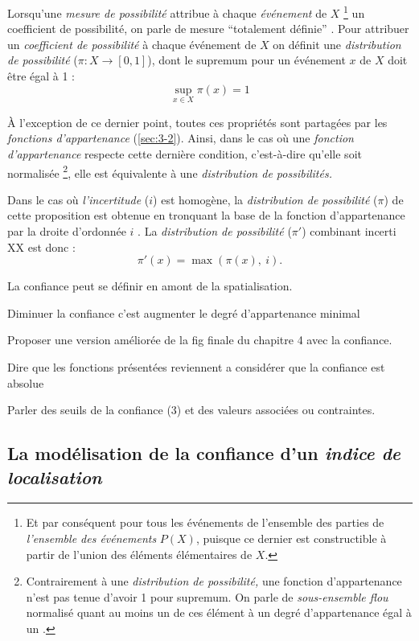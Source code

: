 Lorsqu'une \emph{mesure de possibilité} attribue à chaque
\emph{événement} de \(X\) \footnote{Et par conséquent pour tous les
  événements de l'ensemble des parties de \emph{l'ensemble des
    événements} \(P(X)\), puisque ce dernier est constructible à
  partir de l'union des éléments élémentaires de \(X\).} un
coefficient de possibilité, on parle de mesure \enquote{totalement
  définie} \autocite{Bouchon-Meunier2007}. Pour attribuer un
\emph{coefficient de possibilité} à chaque événement de \(X\) on
définit une \emph{distribution de possibilité} (\(π : X → [0,1]\)),
dont le supremum pour un événement \(x\) de \(X\) doit être égal à 1 :
%
\begin{equation}
  \sup_{x ∈ X}π(x)=1
\end{equation}

À l'exception de ce dernier point, toutes ces propriétés sont
partagées par les \emph{fonctions d'appartenance}
(\autoref{sec:3-2}). Ainsi, dans le cas où une \emph{fonction
  d'appartenance} respecte cette dernière condition, c'est-à-dire
qu'elle soit normalisée \footnote{Contrairement à une
  \emph{distribution de possibilité,} une fonction d'appartenance
  n'est pas tenue d'avoir 1 pour supremum. On parle de
  \emph{sous-ensemble flou} normalisé quant au moins un de ces élément
  à un degré d’appartenance égal à un
  \autocite{Bouchon-Meunier2007}.}, elle est équivalente à une
\emph{distribution de possibilités.}

Dans le cas où \emph{l'incertitude} (\(i\)) est homogène, la
\emph{distribution de possibilité} (\(π\)) de cette proposition est
obtenue en tronquant la base de la fonction d'appartenance par la
droite d'ordonnée \(i\) \autocite{Bouchon-Meunier2007}. La
\emph{distribution de possibilité} (\(π'\)) combinant incerti XX est
donc :
%
\begin{equation}
  π'(x) = \max(π(x),\ i).  
\end{equation}


La confiance peut se définir en amont de la spatialisation.

Diminuer la confiance c'est augmenter le degré d'appartenance minimal

Proposer une version améliorée de la fig finale du chapitre 4 avec la
confiance.

Dire que les fonctions présentées reviennent a considérer que la
confiance est absolue

Parler des seuils de la confiance (3) et des valeurs associées ou
contraintes.


\subsection{La modélisation de la confiance d'un \emph{indice de
    localisation}}

